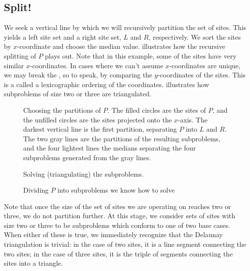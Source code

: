 \documentclass[12pt,twoside]{reedthesis}
\begin{document}
    \subsection{Split!}
    \label{sub:split}
    We seek a vertical line by which we will recursively partition the set of sites. This yields a left site set and a right site set, $L$ and $R$, respectively. We sort the sites by $x$-coordinate and choose the median value.  illustrates how the recursive splitting of $P$ plays out. Note that in this example, some of the sites have very similar $x$-coordinates. In cases where we can't assume $x$-coordinates are unique, we may break the , so to speak, by comparing the $y$-coordinates of the sites. This is a called a lexicographic ordering of the coordinates.  illustrates how subproblems of size two or three are triangulated. \par

    \begin{figure}[!htb]
    \centering
      \begin{subtable}{\textwidth}
        \centering
        
        \caption{Choosing the partitions of $P$. The filled circles are the sites of $P$, and the unfilled circles are the sites projected onto the $x$-axis. The darkest vertical line is the first partition, separating $P$ into $L$ and $R$. The two gray lines are the partitions of the resulting subproblems, and the four lightest lines the medians separating the four subproblems generated from the gray lines.}
        \label{fig:del_partition0}
      \end{subtable}
    \end{figure}

    \begin{figure}[!htb]
    \ContinuedFloat
    \centering
      \begin{subtable}{\textwidth}
        \centering
        
        \caption{Solving (triangulating) the subproblems.}
        \label{fig:del_partition1}
      \end{subtable}
      \caption{Dividing $P$ into subproblems we know how to solve}
      \label{fig:div_and_triangulate}
    \end{figure}

    Note that once the size of the set of sites we are operating on reaches two or three, we do not partition further. At this stage, we consider sets of sites with size two or three to be subproblems which conform to one of two base cases. When either of these is true, we immediately recognize that the Delaunay triangulation is trivial: in the case of two sites, it is a line segment connecting the two sites; in the case of three sites, it is the triple of segments connecting the sites into a triangle.\par
\end{document}
